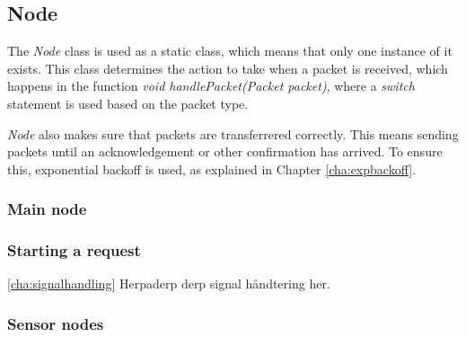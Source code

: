 \subsection{Node}
The \textit{Node} class is used as a static class, which means that only one instance of it exists. This class determines the action to take when a packet is received, which happens in the function \textit{void handlePacket(Packet packet)}, where a \textit{switch} statement is used based on the packet type.

\textit{Node} also makes sure that packets are transferrered correctly. This means sending packets until an acknowledgement or other confirmation has arrived. To ensure this, exponential backoff is used, as explained in Chapter \ref{cha:expbackoff}.

\subsubsection*{Main node}

\subsubsection*{Starting a request} \ref{cha:signalhandling}
Herpaderp derp signal håndtering her.

\subsubsection*{Sensor nodes} 